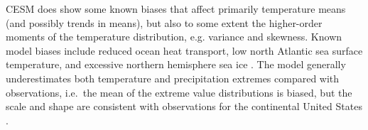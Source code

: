 \documentclass{ametsoc}
\begin{document}



CESM does show some known biases that affect primarily temperature means (and possibly trends in means), 
but also to some extent the higher-order moments of the temperature distribution, e.g. variance and skewness. Known model biases include reduced ocean heat transport, low north Atlantic sea surface temperature, and excessive northern hemisphere sea ice \citep{shields2012low}. %
The model generally underestimates both temperature and precipitation extremes compared with observations, i.e.\ the mean of the extreme value distributions is biased, but the scale and shape are consistent with observations for the continental United States \citep{sriver2015effects}. 
\end{document}
